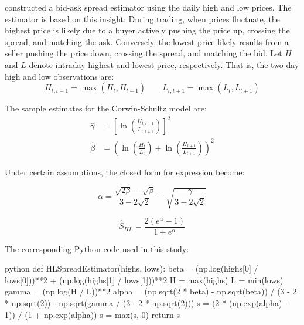 
\noindent \citet{corwin2012simple} constructed a bid-ask spread estimator using the daily high and low prices. The estimator is based on this insight: During trading, when prices fluctuate, the highest price is likely due to a buyer actively pushing the price up, crossing the spread, and matching the ask. Conversely, the lowest price likely results from a seller pushing the price down, crossing the spread, and matching the bid. Let $H$ and $L$ denote intraday highest and lowest price, respectively. That is, the two-day high and low observations are:
$$
H_{t,t+1} = \max(H_t, H_{t+1})\quad\quad L_{t,t+1} = \max(L_t, L_{t+1})
$$

\noindent The sample estimates for the Corwin-Schultz model are:
$$
\begin{aligned}
\hat{\gamma}&=\left[\ln \left(\frac{H_{t, t+1}}{L_{t, t+1}}\right)\right]^2 \\
\hat{\beta}&=\left(\ln \left(\frac{H_t}{L_t}\right)+\ln \left(\frac{H_{t+1}}{L_{t+1}}\right)\right)^2
\end{aligned}
$$

\noindent Under certain assumptions, the closed form for expression become:

$$
\alpha=\frac{\sqrt{2 \beta}-\sqrt{\beta}}{3-2 \sqrt{2}}-\sqrt{\frac{\gamma}{3-2 \sqrt{2}}}
$$

$$
\hat{S}_{H L}=\frac{2\left(e^\alpha-1\right)}{1+e^\alpha}
$$

\newpage

\noindent The corresponding Python code used in this study:
\begin{mintedbox}{python}
def HLSpreadEstimator(highs, lows):
    beta = (np.log(highs[0] / lows[0]))**2 + (np.log(highs[1] / lows[1]))**2
    H = max(highs)
    L = min(lows)
    gamma = (np.log(H / L))**2
    alpha = (np.sqrt(2 * beta) - np.sqrt(beta)) / (3 - 2 * np.sqrt(2)) - np.sqrt(gamma / (3 - 2 * np.sqrt(2)))
    s = (2 * (np.exp(alpha) - 1)) / (1 + np.exp(alpha))
    s = max(s, 0)
    return s
\end{mintedbox}

\vspace{1.5cm}


